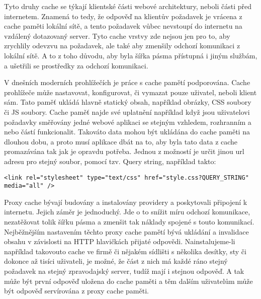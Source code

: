 \documentclass[12pt]{article}
\begin{document}
\obrazek
{}

Tyto druhy cache se týkají klientské části webové architektury, neboli části před internetem. Znamená to tedy, že odpověď na klientův požadavek je vrácena z cache paměti lokální sítě, a tento požadavek vůbec nevstoupí do internetu na vzdálený dotazovaný server. Tyto cache vrstvy zde nejsou jen pro to, aby zrychlily odevzvu na požadavek, ale také aby zmenšily odchozí komunikaci z lokální sítě. A to z toho důvodu, aby byla šířka pásma přístupná i jiným službám, a ušetřili se prostředky za odchozí komunikaci.

V dnešních moderních prohlížečích je práce s cache pamětí podporována. Cache prohlížeče může nastavovat, konfigurovat, či vymazat pouze uživatel, neboli klient sám. Tato paměť ukládá hlavně statický obsah, například obrázky, CSS soubory či JS soubory. Cache paměť najde své uplatnění například když jsou uživatelovi požadavky směřovány jedné webové aplikaci se stejným vzhledem, rozhranním a nebo částí funkcionalit. Takováto data mohou být ukládána do cache paměti na dlouhou dobu, a proto musí aplikace dbát na to, aby byla tato data z cache promazávána tak jak je opravdu potřeba. Jednou z možností je určit jinou url adresu pro stejný soubor, pomocí tzv. Query string, například takto:

\begin{scriptsize}
\begin{verbatim}
<link rel="stylesheet" type="text/css" href="style.css?QUERY_STRING" media="all" />
\end{verbatim}
\end{scriptsize}

Proxy cache bývají budovány a instalovány providery a poskytovali připojení k internetu. Jejich záměr je jednoduchý. Jde o to snížit míru odchozí komunikace, nezatěžovat tolik šířku pásma a zmenšit tak náklady spojené s touto komunikací. Nejběžnějším nastavením těchto proxy cache pamětí bývá ukládání a invalidace obsahu v závislosti na HTTP hlavičkách přijaté odpovědi. Nainstalujeme-li například takovouto cache ve firmě či nějakém sídlišti s několika desítky, sty či dokonce až tisíci uživateli, je možné, že část z nich má každé ráno stejný požadavek na stejný zpravodajský server, tudíž mají i stejnou odpověď. A tak může být první odpověď uložena do cache paměti a těm dalším uživatelům může být odpověď servírována z proxy cache paměti.\cite{proxy-cache}
\end{document}
